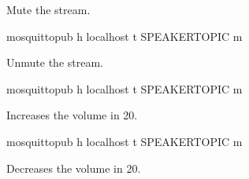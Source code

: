 \documentclass[letterpaper,10pt,english]{sphinxmanual}
\begin{document}
\begin{fulllineitems}
\begin{fulllineitems}

\pysigstartsignatures
{}
\pysigstopsignatures
\sphinxAtStartPar
Mute the stream.

\begin{sphinxVerbatim}[commandchars=\\\{\}]
mosquitto\PYGZus{}pub \PYGZhy{}h localhost \PYGZhy{}t \PYGZpc{}SPEAKER\PYGZus{}TOPIC \PYGZhy{}m 
\end{sphinxVerbatim}

\end{fulllineitems}



\begin{fulllineitems}

\pysigstartsignatures
{}
\pysigstopsignatures
\sphinxAtStartPar
Unmute the stream.

\begin{sphinxVerbatim}[commandchars=\\\{\}]
mosquitto\PYGZus{}pub \PYGZhy{}h localhost \PYGZhy{}t \PYGZpc{}SPEAKER\PYGZus{}TOPIC \PYGZhy{}m 
\end{sphinxVerbatim}

\end{fulllineitems}



\begin{fulllineitems}

\pysigstartsignatures
{}
\pysigstopsignatures
\sphinxAtStartPar
Increases the volume in 20.

\begin{sphinxVerbatim}[commandchars=\\\{\}]
mosquitto\PYGZus{}pub \PYGZhy{}h localhost \PYGZhy{}t \PYGZpc{}SPEAKER\PYGZus{}TOPIC \PYGZhy{}m 
\end{sphinxVerbatim}

\end{fulllineitems}



\begin{fulllineitems}

\pysigstartsignatures
{}
\pysigstopsignatures
\sphinxAtStartPar
Decreases the volume in 20.


\end{fulllineitems}
\end{fulllineitems}
\end{document}
